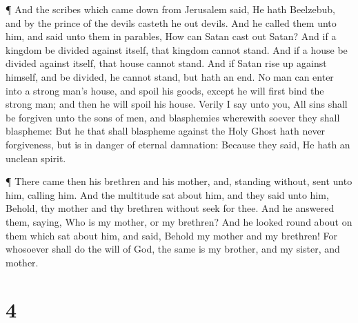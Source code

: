  ¶ And the scribes which came down from Jerusalem said, He
hath Beelzebub, and by the prince of the devils casteth he out devils.
 And he called them unto him, and said unto them in
parables, How can Satan cast out Satan?  And if a kingdom
be divided against itself, that kingdom cannot stand.  And
if a house be divided against itself, that house cannot stand.
 And if Satan rise up against himself, and be divided, he
cannot stand, but hath an end.  No man can enter into a
strong man's house, and spoil his goods, except he will first bind the
strong man; and then he will spoil his house.  Verily I say
unto you, All sins shall be forgiven unto the sons of men, and
blasphemies wherewith soever they shall blaspheme:  But he
that shall blaspheme against the Holy Ghost hath never forgiveness, but
is in danger of eternal damnation:  Because they said, He
hath an unclean spirit.

 ¶ There came then his brethren and his mother, and,
standing without, sent unto him, calling him.  And the
multitude sat about him, and they said unto him, Behold, thy mother and
thy brethren without seek for thee.  And he answered them,
saying, Who is my mother, or my brethren?  And he looked
round about on them which sat about him, and said, Behold my mother and
my brethren!  For whosoever shall do the will of God, the
same is my brother, and my sister, and mother.

\hypertarget{section-3}{%
\section{4}\label{section-3}}

